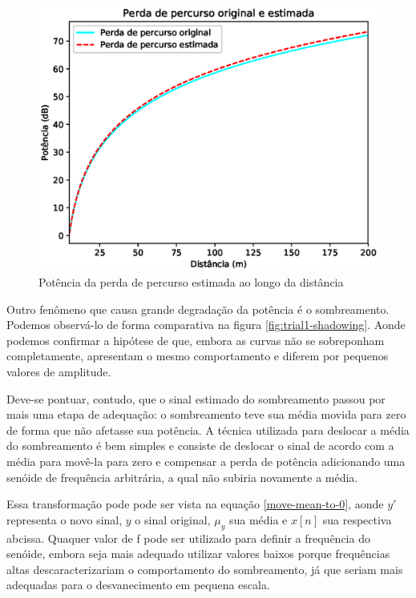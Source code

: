 \documentclass[journal,11pt,twocolumn]{IEEEtran}
\begin{document}
\begin{figure}[h!]
    \centering
    \includegraphics[scale=0.55]{trial1_pathloss.eps}
    \caption{Potência da perda de percurso estimada ao longo da distância}
    \label{fig:trial1-pathloss}
\end{figure}
Outro fenômeno que causa grande degradação da potência é o sombreamento. Podemos observá-lo de forma comparativa na figura \ref{fig:trial1-shadowing}. Aonde podemos confirmar a hipótese de que, embora as curvas não se sobreponham completamente, apresentam o mesmo comportamento e diferem por pequenos valores de amplitude.

Deve-se pontuar, contudo, que o sinal estimado do sombreamento passou por mais uma etapa de adequação: o sombreamento teve sua média movida para zero de forma que não afetasse sua potência. A técnica utilizada para deslocar a média do sombreamento é bem simples e consiste de deslocar o sinal de acordo com a média para movê-la para zero e compensar a perda de potência adicionando uma senóide de frequência arbitrária, a qual não subiria novamente a média.

Essa transformação pode pode ser vista na equação \ref{move-mean-to-0}, aonde $y'$ representa o novo sinal, $y$ o sinal original, $\mu_{y}$ sua média e $x[n]$ sua respectiva abcissa. Quaquer valor de f pode ser utilizado para definir a frequência do senóide, embora seja mais adequado utilizar valores baixos porque frequências altas descaracterizariam o comportamento do sombreamento, já que seriam mais adequadas para o desvanecimento em pequena escala.
\end{document}
